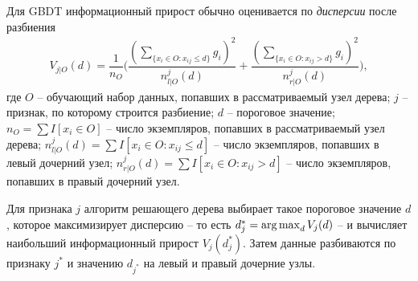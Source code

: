 \documentclass[%
	11pt,
	a4paper,
	utf8,
		]{article}
\begin{document}
Для GBDT информационный прирост обычно оценивается по \emph{дисперсии} после разбиения
\begin{align*}
	V_{ j | O }(d) = \dfrac{1}{n_O} \Bigg( \dfrac{ (\sum_{ \{x_i \in O: x_{ij} \leqslant d \} } g_i)^2 }{ n_{l | O}^j(d) } + \dfrac{ (\sum_{\{x_i \in O: x_{ij} > d \} } g_i )^2 }{ n_{r | O}^j(d) } \Bigg),
\end{align*}
где $ O $ -- обучающий набор данных, попавших в рассматриваемый узел дерева; $ j $ -- признак, по которому строится разбиение; $ d $ -- пороговое значение; $ n_O = \sum I[x_i \in O] $ -- число экземпляров, попавших в рассматриваемый узел дерева; $ n_{ l | O }^j(d) = \sum I[x_i \in O: x_{ij} \leqslant d] $ -- число экземпляров, попавших в левый дочерний узел; $ n_{r | O}^j (d) = \sum I[x_i \in O: x_{ij} > d] $ -- число экземпляров, попавших в правый дочерний узел.

Для признака $ j $ алгоритм решающего дерева выбирает такое пороговое значение $ d $, которое максимизирует дисперсию -- то есть $ d_j^* = \operatorname*{arg\,max}_d V_j(d) $ -- и вычисляет наибольший информационный прирост $ V_j(d_j^*) $. Затем данные разбиваются по признаку $ j^* $ и значению $ d_{j^*} $ на левый и правый дочерние узлы.
\end{document}
